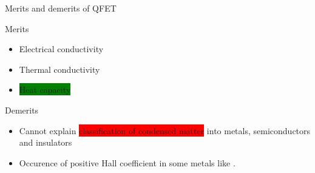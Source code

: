 %
%
\begin{frame}[label=pre-M2T1-slot1]{Merits and demerits of QFET}
\begin{block}{Merits}
		\begin{itemize}
		\item Electrical conductivity
		\item Thermal conductivity
		\item \colorbox{green}{Heat capacity}
	\end{itemize}
\end{block}
%
\begin{block}{Demerits}
	\begin{itemize}
		\item Cannot explain \colorbox{red}{classification of condensed matter} into metals, semiconductors and insulators
		\item Occurence of positive Hall coefficient in some metals like .
	\end{itemize}
\end{block}
\end{frame}